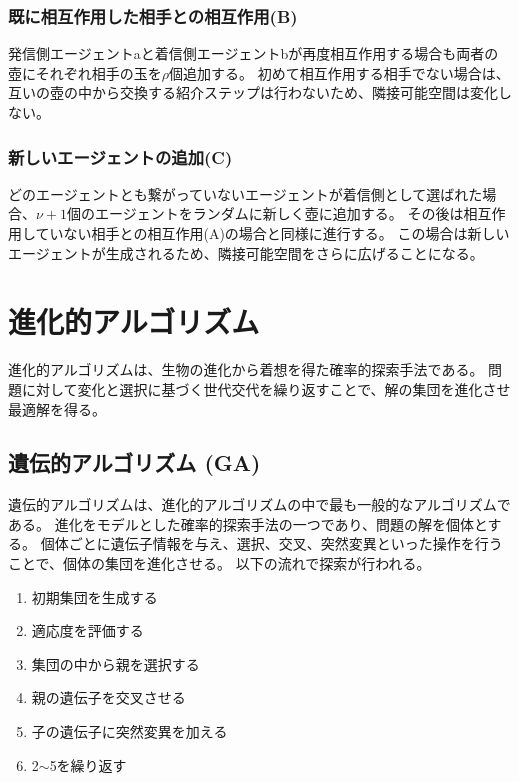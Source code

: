 \documentclass[uplatex,11pt,openany]{ujreport}
\begin{document}
            \subsubsection*{既に相互作用した相手との相互作用(B)}
            発信側エージェントaと着信側エージェントbが再度相互作用する場合も両者の壺にそれぞれ相手の玉を$\rho$個追加する。
            初めて相互作用する相手でない場合は、互いの壺の中から交換する紹介ステップは行わないため、隣接可能空間は変化しない。

            \subsubsection*{新しいエージェントの追加(C)}
            どのエージェントとも繋がっていないエージェントが着信側として選ばれた場合、$\nu+1$個のエージェントをランダムに新しく壺に追加する。
            その後は相互作用していない相手との相互作用(A)の場合と同様に進行する。
            この場合は新しいエージェントが生成されるため、隣接可能空間をさらに広げることになる。







    \section{進化的アルゴリズム}
    進化的アルゴリズムは、生物の進化から着想を得た確率的探索手法である。
    問題に対して変化と選択に基づく世代交代を繰り返すことで、解の集団を進化させ最適解を得る。


        \subsection{遺伝的アルゴリズム (GA)}
        遺伝的アルゴリズムは、進化的アルゴリズムの中で最も一般的なアルゴリズムである。
        進化をモデルとした確率的探索手法の一つであり、問題の解を個体とする。
        個体ごとに遺伝子情報を与え、選択、交叉、突然変異といった操作を行うことで、個体の集団を進化させる。
        以下の流れで探索が行われる。
            \begin{enumerate}
                \item 初期集団を生成する
                \item 適応度を評価する
                \item 集団の中から親を選択する
                \item 親の遺伝子を交叉させる
                \item 子の遺伝子に突然変異を加える
                \item 2$\sim$5を繰り返す
            \end{enumerate}
\end{document}
